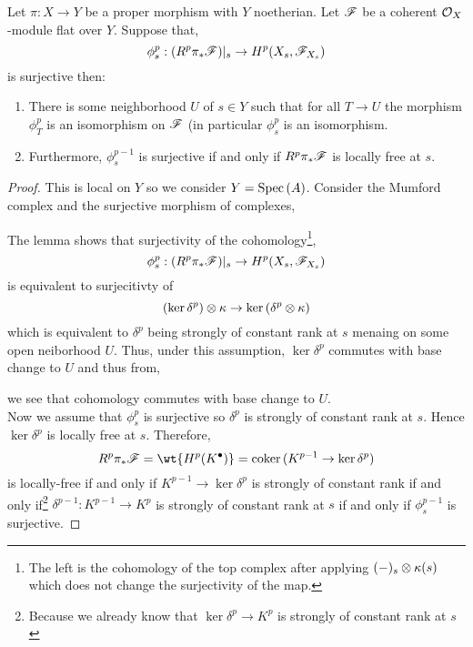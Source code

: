 \documentclass[12pt]{article}
\begin{document}
\begin{thm}
Let $\pi : X \to Y$ be a proper morphism with $Y$ noetherian. Let $\mathscr{F}$ be a coherent $\mathcal{O}_{X}$-module flat over $Y$. Suppose that,
\[ \phi^p_s : (R^p \pi_* \mathscr{F})|_s \to H^p(X_s, \mathscr{F}_{X_s}) \]
is surjective then:
\begin{enumerate}
\item There is some neighborhood $U$ of $s \in Y$ such that for all $T \to U$ the morphism $\phi^p_T$ is an isomorphism on $\mathscr{F}$ (in particular $\phi^p_s$ is an isomorphism.
\item Furthermore, $\phi^{p-1}_s$ is surjective if and only if $R^p \pi_* \mathscr{F}$ is locally free at $s$.
\end{enumerate}
\end{thm}

\begin{proof}
This is local on $Y$ so we consider $Y = \mathrm{Spec}\left( A \right)$. Consider the Mumford complex and the surjective morphism of complexes,
\begin{center}
\end{center}
The lemma shows that surjectivity of the cohomology\footnote{The left is the cohomology of the top complex after applying $(-)_s \otimes \kappa(s)$ which does not change the surjectivity of the map.},
\[ \phi^p_s : (R^p \pi_* \mathscr{F})|_s \to H^p(X_s, \mathscr{F}_{X_s}) \]
is equivalent to surjecitivty of
\[ (\ker{\delta^p}) \otimes \kappa \to \ker{(\delta^p \otimes\kappa)} \]
which is equivalent to $\delta^p$ being strongly of constant rank at $s$ menaing on some open neiborhood $U$. Thus, under this assumption, $\ker{\delta^p}$ commutes with base change to $U$ and thus from,
\begin{center}
\end{center}
we see that cohomology commutes with base change to $U$.
\bigskip\\
Now we assume that $\phi^p_s$ is surjective so $\delta^p$ is strongly of constant rank at $s$. Hence $\ker{\delta^p}$ is locally free at $s$. Therefore, 
\[ R^p \pi_* \F = \wt{H^{p}(K^\bullet)} = \coker{(K^{p-1} \to \ker{\delta^p})} \]
is locally-free if and only if $K^{p-1} \to \ker{\delta^p}$ is strongly of constant rank if and only if\footnote{Because we already know that $\ker{\delta^p} \to K^p$ is strongly of constant rank at $s$} $\delta^{p-1} : K^{p-1} \to K^p$ is strongly of constant rank at $s$ if and only if $\phi^{p-1}_s$ is surjective.
\end{proof}
\end{document}
